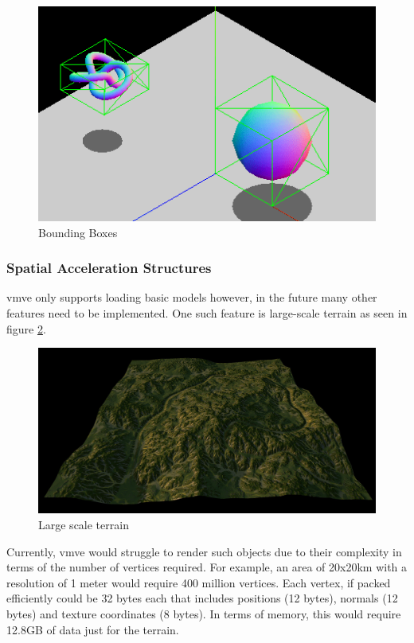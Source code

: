 \documentclass[11pt]{article}
\begin{document}
\begin{figure}[H]
  \centering
  \includegraphics[width=\textwidth]{images/bounding_boxes.png}
  \caption{Bounding Boxes \cite{bounding_boxes}}
  \label{fig:bounding_boxes}
\end{figure}


\subsubsection{Spatial Acceleration Structures}
\gls*{vmve} only supports loading basic models however, in the future many other
features need to be implemented. One such feature is large-scale terrain as seen
in figure \ref{fig:quad_tree_terrain}.

\begin{figure}[H]
  \centering
  \includegraphics[width=\textwidth]{images/quad_tree_terrain.png}
  \caption{Large scale terrain}
  \label{fig:quad_tree_terrain}
\end{figure}

Currently, \gls*{vmve} would struggle to render such objects due to their
complexity in terms of the number of vertices required. For example, an area of
20x20km with a resolution of 1 meter would require 400 million vertices. Each
vertex, if packed efficiently could be 32 bytes each that includes positions (12
bytes), normals (12 bytes) and texture coordinates (8 bytes). In terms of
memory, this would require 12.8GB of data just for the terrain.
\end{document}
